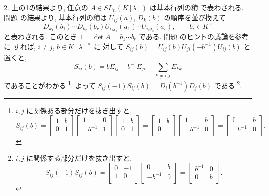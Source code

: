\documentclass[12pt,twoside]{jarticle}
\begin{document}
2. 上の1の結果より, 任意の $A\in SL_n(K[\lambda])$ は基本行列の積
で表わされる. 問題  の結果より, 
基本行列の積は $U_{ij}(a)$, $D_k(b)$ の順序を並び換えて 
\begin{equation*}
  D_{k_1}(b_1)\cdots D_{k_r}(b_r)U_{i_1j_1}(a_1)\cdots U_{i_sj_s}(a_s),
  \qquad b_i\in K^\times
\end{equation*}
と表わされる. このとき $1=\det A=b_1\cdots b_r$ である.
問題  のヒントの議論を参考に
すれば, $i\ne j$, $b\in K[\lambda]^\times$ に
対して $S_{ij}(b)=U_{ij}(b)U_{ji}(-b^{-1})U_{ij}(b)$ と置くと, 
\begin{equation*}
  S_{ij}(b) = bE_{ij} - b^{-1}E_{ji} + \sum_{k\ne i,j}E_{kk}
\end{equation*}
であることがわかる%
\footnote{$i,j$ に関係ある部分だけを抜き出すと,
  \begin{equation*}
    S_{ij}(b) =
    \begin{bmatrix}
      1 & b \\
      0 & 1 \\
    \end{bmatrix}
    \begin{bmatrix}
         1    & 0 \\
      -b^{-1} & 1 \\
    \end{bmatrix}
    \begin{bmatrix}
      1 & b \\
      0 & 1 \\
    \end{bmatrix}
    =
    \begin{bmatrix}
      1 & b \\
      0 & 1 \\
    \end{bmatrix}
    \begin{bmatrix}
         1    & b \\
      -b^{-1} & 0 \\
    \end{bmatrix}
    =
    \begin{bmatrix}
      0       & b \\
      -b^{-1} & 0 \\
    \end{bmatrix}.
  \end{equation*}
  }. %
よって $S_{ij}(-1)S_{ij}(b) = D_i(b^{-1})D_j(b)$ である%
\footnote{$i,j$ に関係する部分だけを抜き出すと,
  \begin{equation*}
    S_{ij}(-1) S_{ij}(b) = 
    \begin{bmatrix}
      0 & -1 \\
      1 & 0 \\
    \end{bmatrix}
    \begin{bmatrix}
      0       & b \\
      -b^{-1} & 0 \\
    \end{bmatrix}
    =
    \begin{bmatrix}
      b^{-1} & 0 \\
        0    & b \\
    \end{bmatrix}.
  \end{equation*}
  }. %
\end{document}
